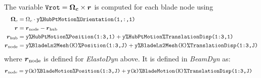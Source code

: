 \documentclass[11pt]{article}
\begin{document}
The variable $\texttt{Vrot}=\boldsymbol{\Omega_c}\times\boldsymbol{r}$ is computed for each blade node using
\begin{align}
    \boldsymbol{\Omega}_c  &= \Omega_c \cdot \texttt{y\%HubPtMotion\%Orientation(1,:,1)}\nonumber\\
    \boldsymbol{r} &= \boldsymbol{r}_\text{node} - \boldsymbol{r}_\text{hub} \label{eq:Vrot}  \\
    \boldsymbol{r}_\text{hub} &= \texttt{y\%HubPtMotion\%Position(1:3,1)} + \texttt{y\%HubPtMotion\%TranslationDisp(1:3,1)}  \nonumber \\
    \boldsymbol{r}_\text{node} &= \texttt{y\%BladeLn2Mesh(K)\%Position(1:3,J)} + \texttt{y\%BladeLn2Mesh(K)\%TranslationDisp(1:3,J)}  \nonumber 
\end{align}
where $\boldsymbol{r}_\text{node}$ is defined for \textit{ElastoDyn} above. It is defined in \textit{BeamDyn} as:
\begin{align}
    \boldsymbol{r}_\text{node} &= \texttt{y(k)\%BladeMotion\%Position(1:3,J)} + \texttt{y(k)\%BladeMotion(K)\%TranslationDisp(1:3,J)}  \nonumber 
\end{align}


% 

%
%
\end{document}

